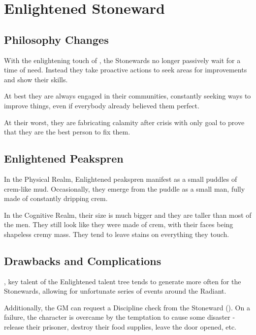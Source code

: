 \newpage
\section{Enlightened Stoneward}


\subsection{Philosophy Changes}

With the enlightening touch of \npcSjaAnat{}, the Stonewards no longer passively wait for a time of need. Instead they take proactive actions to seek areas for improvements and show their skills.

At best they are always engaged in their communities, constantly seeking ways to improve things, even if everybody already believed them perfect.

At their worst, they are fabricating calamity after crisis with only goal to prove that they are the best person to fix them.

\subsection{Enlightened Peakspren}

In the Physical Realm, Enlightened peakspren manifest as a small puddles of crem-like mud. Occasionally, they emerge from the puddle as a small man, fully made of constantly dripping crem.

In the Cognitive Realm, their size is much bigger and they are taller than most of the men. They still look like they were made of crem, with their faces being shapeless cremy mass. They tend to leave stains on everything they touch.

\subsection{Drawbacks and Complications}

\talentStonewardKeyName{}, key talent of the Enlightened talent tree tends to generate \iconComp{} more often for the Stonewards, allowing for unfortunate series of events around the Radiant.

Additionally, the GM can request a Discipline check from the Stoneward (\corruptedResistanceDC{}). On a failure, the character is overcame by the temptation to cause some disaster - release their prisoner, destroy their food supplies, leave the door opened, etc.

